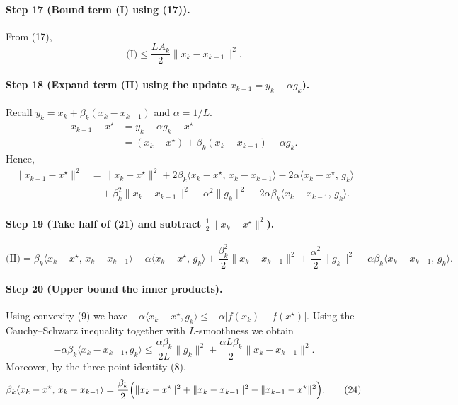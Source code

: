 \documentclass{article}
\begin{document}
\paragraph{Step 17 (Bound term (I) using (17)).}
From (17),
\[
\text{(I)}\le \frac{L A_k}{2}\|x_k-x_{k-1}\|^{2}.
\tag{20}
\]

\paragraph{Step 18 (Expand term (II) using the update $x_{k+1}=y_k-\alpha g_k$).}
Recall $y_k = x_k+\beta_k(x_k-x_{k-1})$ and $\alpha=1/L$.
\[
\begin{aligned}
x_{k+1}-x^\star
&= y_k-\alpha g_k - x^\star \\
&= (x_k-x^\star)+\beta_k(x_k-x_{k-1})-\alpha g_k .
\end{aligned}
\]
Hence,
\[
\begin{aligned}
\|x_{k+1}-x^\star\|^{2}
&= \|x_k-x^\star\|^{2}
   +2\beta_k\langle x_k-x^\star,\,x_k-x_{k-1}\rangle
   -2\alpha\langle x_k-x^\star,\,g_k\rangle \\
&\quad +\beta_k^{2}\|x_k-x_{k-1}\|^{2}
   +\alpha^{2}\|g_k\|^{2}
   -2\alpha\beta_k\langle x_k-x_{k-1},\,g_k\rangle .
\end{aligned}
\tag{21}
\]

\paragraph{Step 19 (Take half of (21) and subtract $\frac12\|x_k-x^\star\|^{2}$).}
\[
\text{(II)} = \beta_k\langle x_k-x^\star,\,x_k-x_{k-1}\rangle
   -\alpha\langle x_k-x^\star,\,g_k\rangle
   +\frac{\beta_k^{2}}{2}\|x_k-x_{k-1}\|^{2}
   +\frac{\alpha^{2}}{2}\|g_k\|^{2}
   -\alpha\beta_k\langle x_k-x_{k-1},\,g_k\rangle .
\tag{22}
\]

\paragraph{Step 20 (Upper bound the inner products).}
Using convexity (9) we have $-\alpha\langle x_k-x^\star, g_k\rangle\le -\alpha\bigl[f(x_k)-f(x^\star)\bigr]$.
Using the Cauchy–Schwarz inequality together with $L$‑smoothness we obtain
\[
-\alpha\beta_k\langle x_k-x_{k-1},g_k\rangle
\le \frac{\alpha\beta_k}{2L}\|g_k\|^{2}
     +\frac{\alpha L\beta_k}{2}\|x_k-x_{k-1}\|^{2}.
\tag{23}
\]
Moreover, by the three‑point identity (8),
\[
\beta_k\langle x_k-x^\star,\,x_k-x_{k-1}\rangle
= \frac{\beta_k}{2}\Bigl(\|x_k-x^\star\|^{2}
                     +\|x_k-x_{k-1}\|^{2}
                     -\|x_{k-1}-x^\star\|^{2}\Bigr).
\tag{24}
\]
\end{document}
